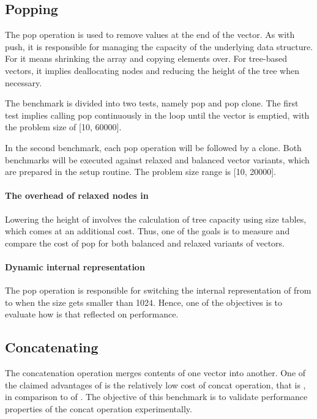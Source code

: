 
\subsection{Popping}
The pop operation is used to remove values at the end of the vector. As with push, it is responsible for managing the capacity of the underlying data structure. For \stdvec{} it means shrinking the array and copying elements over. For tree-based vectors, it implies deallocating nodes and reducing the height of the tree when necessary. 

The benchmark is divided into two tests, namely pop and pop clone. The first test implies calling pop continuously in the loop until the vector is emptied, with the problem size of [10, 60000]. 

In the second benchmark, each pop operation will be followed by a clone. Both benchmarks will be executed against relaxed and balanced vector variants, which are prepared in the setup routine. The problem size range is [10, 20000].

\paragraph*{The overhead of relaxed nodes in \rrbtree{}}
Lowering the height of \rrbtree{} involves the calculation of tree capacity using size tables, which comes at an additional cost. Thus, one of the goals is to measure and compare the cost of pop for both balanced and relaxed variants of vectors. 

\paragraph*{Dynamic internal representation}
The pop operation is responsible for switching the internal representation of \pvec{} from \rrbvec{} to \stdvec{} when the size gets smaller than 1024. Hence, one of the objectives is to evaluate how is that reflected on performance. 

\subsection{Concatenating}
The concatenation operation merges contents of one vector into another. One of the claimed advantages of \rrbtree{} is the relatively low cost of concat operation, that is  , in comparison to  of \stdvec{}. The objective of this benchmark is to validate performance properties of the concat operation experimentally. 

